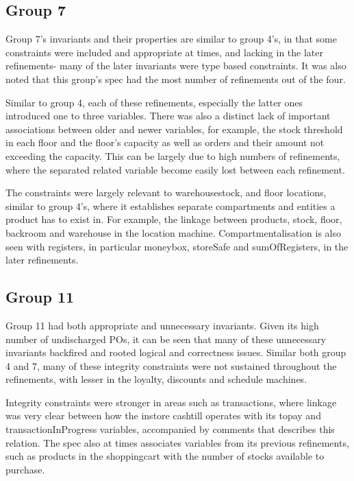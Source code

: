 \subsection{Group 7}
\label{group7}

Group 7’s invariants and their properties are similar to group 4’s, in that some constraints were included and appropriate at times, and lacking in the later refinements- many of the later invariants were type based constraints. It was also noted that this group’s spec had the most number of refinements out of the four.

Similar to group 4, each of these refinements, especially the latter ones introduced one to three variables. There was also a distinct lack of important associations between older and newer variables, for example, the stock threshold in each floor and the floor’s capacity as well as orders and their amount not exceeding the capacity. This can be largely due to high numbers of refinements, where the separated related variable become easily lost between each refinement.

The constraints were largely relevant to warehousestock, and floor locations, similar to group 4’s, where it establishes separate compartments and entities a product has to exist in. For example, the linkage between products, stock, floor, backroom and warehouse in the location machine. Compartmentalisation is also seen with registers, in particular moneybox, storeSafe and sumOfRegisters, in the later refinements. 

\subsection{Group 11}
\label{group11}

Group 11 had both appropriate and unnecessary invariants. Given its high number of undischarged POs, it can be seen that many of these unnecessary invariants backfired and rooted logical and correctness issues. Similar both group 4 and 7, many of these integrity constraints were not sustained throughout the refinements, with lesser in the loyalty, discounts and schedule machines. 

Integrity constraints were stronger in areas such as transactions, where linkage was very clear between how the instore cashtill operates with its topay and transactionInProgress variables, accompanied by comments that describes this relation. The spec also at times associates variables from its previous refinements, such as products in the shoppingcart with the number of stocks available to purchase.

